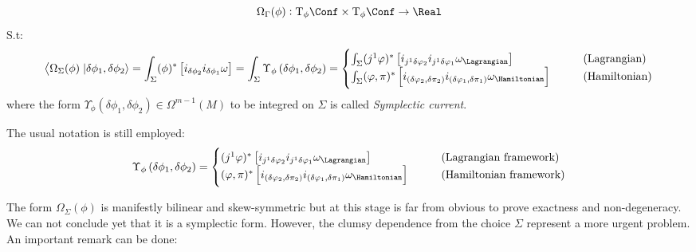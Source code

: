 \documentclass[a4paper,12pt]{scrartcl}  %
\begin{document}
\begin{definition}\label{Def:presymform}
	\begin{displaymath}
		\Omega_\Gamma ( \phi ) : \textrm{T}_\phi \Conf \times \textrm{T}_\phi \Conf \rightarrow \Real
\end{displaymath}		
	S.t:
	\begin{displaymath}
		\left\langle	\Omega_\Sigma ( \phi) \right.\left\lvert \delta \phi_1 , \delta \phi_2 \right\rangle =		
		\int_\Sigma (\phi)^\ast \left[ i_{\delta\phi_2} i_{\delta \phi_1} \omega \right] =
		\int_\Sigma \Upsilon_\phi \left( \delta \phi_1 , \delta \phi_2 \right) = 
		\begin{cases}
			\int_\Sigma (j^1 \varphi)^\ast \left[ i_{j^1 \delta\varphi_2} i_{j^1 \delta \varphi_1} \omega_\Lagrangian \right]
			& \qquad \textrm{(Lagrangian)} \\
			\int_\Sigma (\varphi, \pi)^\ast \left[ i_{( \delta \varphi_2, \delta \pi_2)} i_{( \delta \varphi_1, \delta \pi_1)} \omega_\Hamiltonian \right]
			& \qquad \textrm{(Hamiltonian)} 		
		\end{cases}
	\end{displaymath}
where the form $\Upsilon_\phi \left( \delta \phi_1 , \delta \phi_2 \right)  \in \Omega^{m-1}(M)$ to be integred on $\Sigma$ is called \emph{Symplectic current}.
\end{definition}
\begin{notation}
	The usual notation is still employed:
	\begin{displaymath}
		\Upsilon_\phi \left( \delta \phi_1 , \delta \phi_2 \right) = 
			\begin{cases}
				(j^1 \varphi)^\ast \left[ i_{j^1 \delta\varphi_2} i_{j^1 \delta \varphi_1} \omega_\Lagrangian \right]
				& \qquad \textrm{(Lagrangian framework)} \\
				(\varphi, \pi)^\ast \left[ i_{( \delta \varphi_2, \delta \pi_2)} i_{( \delta \varphi_1, \delta \pi_1)} \omega_\Hamiltonian \right]
				& \qquad \textrm{(Hamiltonian framework)} 		
			\end{cases}	
	\end{displaymath}

\end{notation}


The form $\Omega_\Sigma (\phi)$ is manifestly bilinear and skew-symmetric but at this stage is far from obvious to prove exactness and non-degeneracy. We can not conclude yet that it is a symplectic form.
However, the clumsy dependence from the choice $\Sigma$ represent a more urgent problem.
An important remark can be done:
\end{document}
